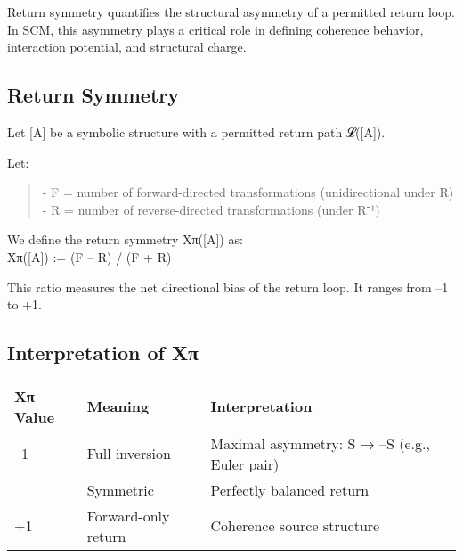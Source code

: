 Return symmetry quantifies the structural asymmetry of a permitted
return loop. In SCM, this asymmetry plays a critical role in defining
coherence behavior, interaction potential, and structural charge.

\subsection{Return Symmetry}\label{return-symmetry}

Let {[}A{]} be a symbolic structure with a permitted return path
𝓛({[}A{]}).

Let:

\begin{quote}
- F = number of forward-directed transformations (unidirectional under
R)\\
- R = number of reverse-directed transformations (under R⁻¹)
\end{quote}

We define the return symmetry Xπ({[}A{]}) as:\\
Xπ({[}A{]}) := (F -- R) / (F + R)

This ratio measures the net directional bias of the return loop. It
ranges from --1 to +1.

\subsection{Interpretation of Xπ}\label{interpretation-of-xux3c0}

\begin{longtable}[]{@{}
  >{\raggedright\arraybackslash}p{}
  >{\raggedright\arraybackslash}p{}
  >{\raggedright\arraybackslash}p{}@{}}
\toprule\noalign{}
\begin{minipage}[b]{\linewidth}\raggedright
Xπ Value
\end{minipage} & \begin{minipage}[b]{\linewidth}\raggedright
Meaning
\end{minipage} & \begin{minipage}[b]{\linewidth}\raggedright
Interpretation
\end{minipage} \\
\midrule\noalign{}
\endhead
\bottomrule\noalign{}
\endlastfoot
--1 & Full inversion & Maximal asymmetry: S → --S (e.g., Euler pair) \\
0 & Symmetric & Perfectly balanced return \\
+1 & Forward-only return & Coherence source structure \\
\end{longtable}


